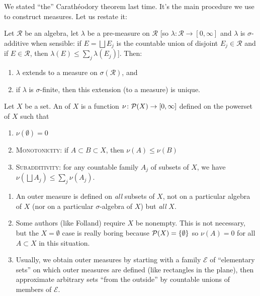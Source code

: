 

\begin{node}
We stated ``the'' Carath\'{e}odory theorem last time. It's the main
procedure we use to construct measures. Let us restate it:
\end{node}

\begin{theorem}
Let $\mathcal{R}$ be an algebra, let $\lambda$ be a pre-measure on
$\mathcal{R}$ [so $\lambda\colon\mathcal{R}\to[0,\infty]$ and
  $\lambda$ is $\sigma$-additive when sensible: if $E=\bigsqcup E_{j}$ is the
  countable union of disjoint $E_{j}\in\mathcal{R}$ and if
  $E\in\mathcal{R}$, then $\lambda(E)\leq\sum_{j}\lambda(E_{j})$].
Then:
\begin{enumerate}
\item $\lambda$ extends to a measure on $\sigma(\mathcal{R})$, and
\item if $\lambda$ is $\sigma$-finite, then this extension (to a
  measure) is unique.
\end{enumerate}
\end{theorem}

\begin{definition}
Let $X$ be a set. An  of $X$ is a function
$\nu\colon\mathcal{P}(X)\to[0,\infty]$ defined on the powerset of $X$
such that
\begin{enumerate}
\item $\nu(\emptyset)=0$
\item \textsc{Monotonicity}: if $A\subset B\subset X$, then $\nu(A)\leq\nu(B)$
\item \textsc{Subadditivity}: for any countable family $A_{j}$ of
  subsets of $X$, we have $\nu(\bigsqcup A_{j})\leq\sum_{j}\nu(A_{j})$.
\end{enumerate}
\end{definition}

\begin{remark}
\begin{enumerate}
\item An outer measure is defined on \emph{all} subsets of $X$, not on
  a particular algebra of $X$ (nor on a particular $\sigma$-algebra of
  $X$) but \emph{all} $X$.
\item Some authors (like Folland) require $X$ be nonempty. This is not
  necessary, but the $X=\emptyset$ case is really boring because
  $\mathcal{P}(X)=\{\emptyset\}$ so $\nu(A)=0$ for all $A\subset X$ in
  this situation.
\item Usually, we obtain outer measures by starting with a family
  $\mathcal{E}$ of ``elementary sets'' on which outer measures are
  defined (like rectangles in the plane), then approximate arbitrary
  sets ``from the outside'' by countable unions of members of
  $\mathcal{E}$. 
\end{enumerate}
\end{remark}

